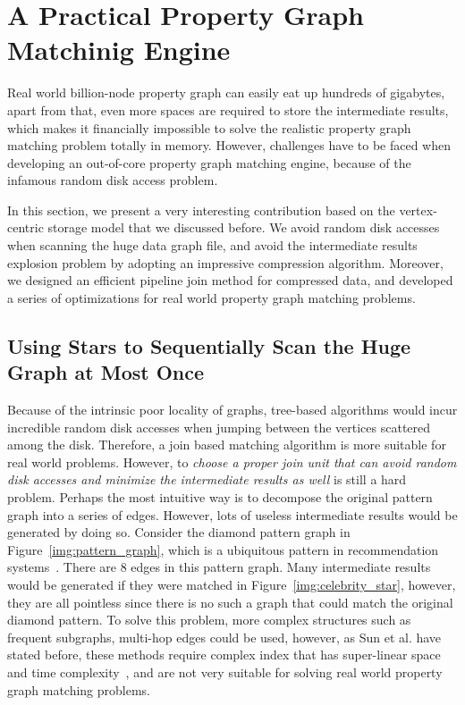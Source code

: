 \section{A Practical Property Graph Matchinig Engine}\label{sec:match}
Real world billion-node property graph can easily eat up hundreds of gigabytes,
apart from that, even more spaces are required to store the intermediate results,
which makes it financially impossible to solve the realistic property graph matching problem totally in memory.
However, challenges have to be faced when developing an out-of-core property graph matching engine,
because of the infamous random disk access problem.

In this section, we present a very interesting contribution based on the vertex-centric storage model that we discussed before.
We avoid random disk accesses when scanning the huge data graph file,
and avoid the intermediate results explosion problem by adopting an impressive compression algorithm.
Moreover, we designed an efficient pipeline join method for compressed data,
and developed a series of optimizations for real world property graph matching problems.
\subsection{Using Stars to Sequentially Scan the Huge Graph at Most Once}
Because of the intrinsic poor locality of graphs,
tree-based algorithms would incur incredible random disk accesses when jumping between the vertices scattered among the disk.
Therefore, a join based matching algorithm is more suitable for real world problems.
However, to \emph{choose a proper join unit that can avoid random disk accesses and minimize the intermediate results as well} is still a hard problem.
Perhaps the most intuitive way is to decompose the original pattern graph into a series of edges.
However, lots of useless intermediate results would be generated by doing so.
Consider the diamond pattern graph in Figure~\ref{img:pattern_graph},
which is a ubiquitous pattern in recommendation systems~\cite{DBLP:journals/pvldb/GuptaSGGZLL14}.
There are 8 edges in this pattern graph.
Many intermediate results would be generated if they were matched in Figure~\ref{img:celebrity_star},
however, they are all pointless since there is no such a graph that could match the original diamond pattern.
To solve this problem, more complex structures such as frequent subgraphs, multi-hop edges could be used,
however, as Sun et al\@. have stated before,
these methods require complex index that has super-linear space and time complexity~\cite{DBLP:journals/pvldb/SunWWSL12}, and are not very suitable for solving real world property graph matching problems.

